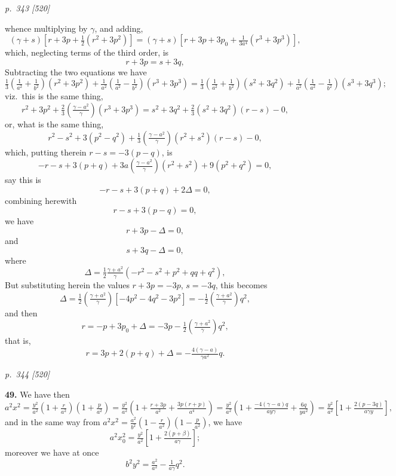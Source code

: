 \documentclass[11pt,a4paper]{book}
\begin{document}
\clearpage

\bigskip
\textit{p.~343 [520]}
\smallskip

whence multiplying by $\gamma$, and adding,
\[
(\gamma + s)\!\left[r + 3p + \tfrac{1}{2}(r^2 + 3p^2)\right] = (\gamma + s)\!\left[r + 3p + 3p_0 + \tfrac{1}{3a^4}(r^3 + 3p^3)\right],
\]
which, neglecting terms of the third order, is
\[
r + 3p = s + 3q,
\]
Subtracting the two equations we have
\[
\tfrac{1}{3}\!\left(\tfrac{1}{a^2} + \tfrac{1}{b^2}\right)(r^2 + 3p^2) + \tfrac{1}{a^2}\!\left(\tfrac{1}{a^2} - \tfrac{1}{b^2}\right)(r^3 + 3p^3) = \tfrac{1}{3}\!\left(\tfrac{1}{a^2} + \tfrac{1}{b^2}\right)(s^2 + 3q^2) + \tfrac{1}{a^2}\!\left(\tfrac{1}{a^2} - \tfrac{1}{b^2}\right)(s^3 + 3q^3);
\]
viz.\ this is the same thing,
\[
r^2 + 3p^2 + \tfrac{2}{3}\!\left(\tfrac{\gamma - a^2}{\gamma}\right)\!(r^3 + 3p^3) = s^2 + 3q^2 + \tfrac{2}{3}(s^2 + 3q^2)(r - s) - 0,
\]
or, what is the same thing,
\[
r^2 - s^2 + 3(p^2 - q^2) + \tfrac{1}{3}\!\left(\tfrac{\gamma - a^2}{\gamma}\right)\!(r^2 + s^2)(r - s) - 0,
\]
which, putting therein $r - s = -3(p - q)$, is
\[
-r - s + 3(p + q) + 3a\!\left(\tfrac{\gamma - a^2}{\gamma}\right)\!(r^2 + s^2) + 9(p^2 + q^2) = 0,
\]
say this is
\[
-r - s + 3(p + q) + 2\Delta = 0,
\]
combining herewith
\[
r - s + 3(p - q) = 0,
\]
we have
\[
r + 3p - \Delta = 0,
\]
and
\[
s + 3q - \Delta = 0,
\]
where
\[
\Delta = \tfrac{1}{2}\tfrac{\gamma + a^2}{\gamma}(-r^2 - s^2 + p^2 + qq + q^2),
\]
But substituting herein the values $r + 3p = -3p$, $s = -3q$, this becomes
\[
\Delta = \tfrac{1}{2}\!\left(\tfrac{\gamma + a^2}{\gamma}\right)\!\!\left[-4p^2 - 4q^2 - 3p^2\right] = -\tfrac{1}{2}\!\left(\tfrac{\gamma + a^2}{\gamma}\right)\!q^2,
\]
and then
\[
r = -p + 3p_0 + \Delta = -3p - \tfrac{1}{2}\!\left(\tfrac{\gamma + a^2}{\gamma}\right)\!q^2,
\]
that is,
\[
r = 3p + 2(p + q) + \Delta = -\tfrac{4(\gamma - a)}{\gamma a^2}q.
\]

\clearpage

\bigskip
\textit{p.~344 [520]}
\smallskip

\textbf{49.} We have then
\[
a^2 x^2 = \tfrac{y^2}{a^2}\!\left(1 + \tfrac{r}{a^2}\right)\!\left(1 + \tfrac{p}{a^2}\right) = \tfrac{y^2}{a^2}\!\left(1 + \tfrac{r + 3p}{a^2} + \tfrac{3p(r + p)}{a^4}\right) = \tfrac{y^2}{a^2}\!\left(1 + \tfrac{-4(\gamma - a)q}{ay\gamma} + \tfrac{6q}{y a^2}\right) = \tfrac{y^2}{a^2}\!\left[1 + \tfrac{2(p - 3q)}{a\gamma y}\right],
\]
and in the same way from $a^2 x^2 = \tfrac{a^2}{b^2}\!\left(1 - \tfrac{r}{a^2}\right)\!\left(1 - \tfrac{p}{a^2}\right)$, we have
\[
a^2 x_0^2 = \tfrac{y^2}{a^2}\!\left[1 + \tfrac{2(p + \beta)}{a\gamma}\right];
\]
moreover we have at once
\[
b^2 y^2 = \tfrac{a^2}{a^2} - \tfrac{1}{a\gamma}q^2.
\]
\end{document}
